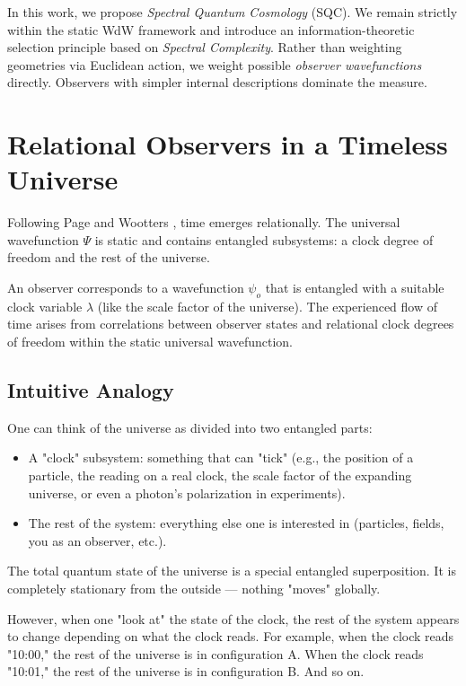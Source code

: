 In this work, we propose \textit{Spectral Quantum Cosmology} (SQC).
We remain strictly within the static WdW framework and introduce an information-theoretic selection principle based on \textit{Spectral Complexity}.
Rather than weighting geometries via Euclidean action, we weight possible \textit{observer wavefunctions} directly.
Observers with simpler internal descriptions dominate the measure.

\section{Relational Observers in a Timeless Universe}

Following Page and Wootters \cite{page1983clock}, time emerges relationally.
The universal wavefunction $\Psi$ is static and contains entangled subsystems: a clock degree of freedom and the rest of the universe.

An observer corresponds to a wavefunction $\psi_o$ that is entangled with a suitable clock variable $\lambda$ (like the scale factor of the universe).
The experienced flow of time arises from correlations between observer states and relational clock degrees of freedom within the static universal wavefunction.

\subsection*{Intuitive Analogy}

One can think of the universe as divided into two entangled parts:
\begin{itemize}
\item A "clock" subsystem: something that can "tick" (e.g., the position of a particle, the reading on a real clock, the scale factor of the expanding universe, or even a photon's polarization in experiments).

\item The rest of the system: everything else one is interested in (particles, fields, you as an observer, etc.).
\end{itemize}

The total quantum state of the universe is a special entangled superposition. It is completely stationary from the outside — nothing "moves" globally.

However, when one "look at" the state of the clock, the rest of the system appears to change depending on what the clock reads. For example, when the clock reads "10:00," the rest of the universe is in configuration A.
When the clock reads "10:01," the rest of the universe is in configuration B. And so on. 

